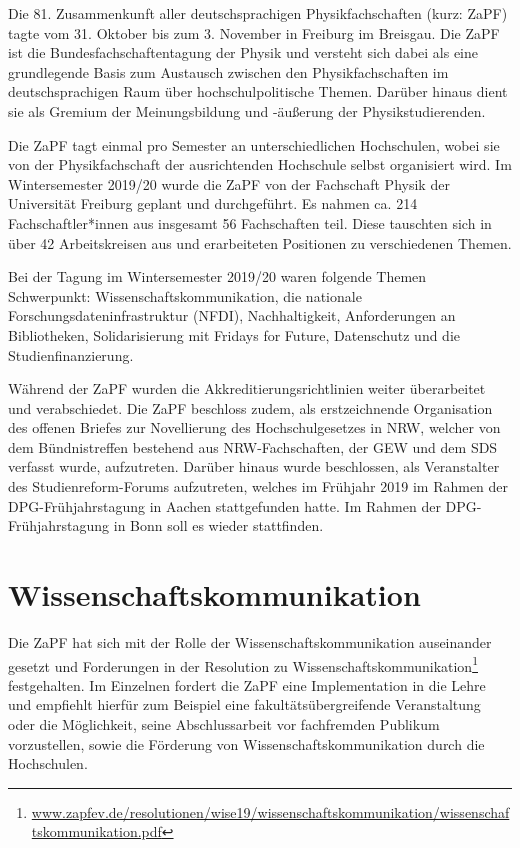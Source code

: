 Die 81. Zusammenkunft aller deutschsprachigen Physikfachschaften (kurz: ZaPF) tagte vom 31. Oktober bis zum 3. November in Freiburg im Breisgau. Die ZaPF ist die Bundesfachschaftentagung der Physik und versteht sich dabei als eine grundlegende Basis zum Austausch zwischen den Physikfachschaften im deutschsprachigen Raum über hochschulpolitische Themen. Darüber hinaus dient sie als Gremium der Meinungsbildung und -äußerung der Physikstudierenden.

Die ZaPF tagt einmal pro Semester an unterschiedlichen Hochschulen, wobei sie von der Physikfachschaft der ausrichtenden Hochschule selbst organisiert wird. 
Im Wintersemester 2019/20 wurde die ZaPF von der Fachschaft Physik der Universität Freiburg geplant und durchgeführt.  
Es nahmen ca. 214 Fachschaftler*innen aus insgesamt 56 Fachschaften teil.
Diese tauschten sich in über 42 Arbeitskreisen aus und erarbeiteten Positionen zu verschiedenen Themen.

Bei der Tagung im Wintersemester 2019/20 waren folgende Themen Schwerpunkt: Wissenschaftskommunikation, die nationale Forschungsdateninfrastruktur (NFDI), Nachhaltigkeit, Anforderungen an Bibliotheken, Solidarisierung mit Fridays for Future, Datenschutz und die Studienfinanzierung. 

Während der ZaPF wurden die Akkreditierungsrichtlinien weiter überarbeitet und verabschiedet. Die ZaPF beschloss zudem, als erstzeichnende Organisation des offenen Briefes zur Novellierung des Hochschulgesetzes in NRW, welcher von dem Bündnistreffen bestehend aus NRW-Fachschaften, der GEW und dem SDS verfasst wurde, aufzutreten. Darüber hinaus wurde beschlossen, als Veranstalter des Studienreform-Forums aufzutreten, welches im Frühjahr 2019 im Rahmen der DPG-Frühjahrstagung in Aachen stattgefunden hatte. Im Rahmen der DPG-Frühjahrstagung in Bonn soll es wieder stattfinden.

\section*{Wissenschaftskommunikation}
Die ZaPF hat sich mit der Rolle der Wissenschaftskommunikation auseinander gesetzt und Forderungen in der Resolution zu Wissenschaftskommunikation\footnote{\url{www.zapfev.de/resolutionen/wise19/wissenschaftskommunikation/wissenschaftskommunikation.pdf}} festgehalten. Im Einzelnen fordert die ZaPF eine Implementation in die Lehre und empfiehlt hierfür zum Beispiel eine fakultätsübergreifende Veranstaltung oder die Möglichkeit, seine Abschlussarbeit vor fachfremden Publikum vorzustellen, sowie die Förderung von Wissenschaftskommunikation durch die Hochschulen.

